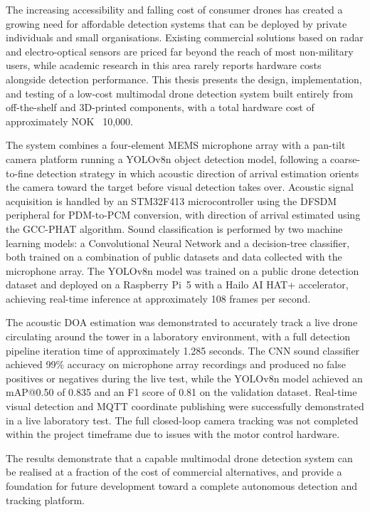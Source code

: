 The increasing accessibility and falling cost of consumer drones has 
created a growing need for affordable detection systems that can be 
deployed by private individuals and small organisations. Existing 
commercial solutions based on radar and electro-optical sensors are 
priced far beyond the reach of most non-military users, while 
academic research in this area rarely reports hardware costs alongside 
detection performance. This thesis presents the design, implementation, 
and testing of a low-cost multimodal drone detection system built 
entirely from off-the-shelf and 3D-printed components, with a total 
hardware cost of approximately NOK~ 10,000.

The system combines a four-element MEMS microphone array with a 
pan-tilt camera platform running a YOLOv8n object detection model, 
following a coarse-to-fine detection strategy in which acoustic 
direction of arrival estimation orients the camera toward the target 
before visual detection takes over. Acoustic signal acquisition is 
handled by an STM32F413 microcontroller using the DFSDM peripheral 
for PDM-to-PCM conversion, with direction of arrival estimated using 
the GCC-PHAT algorithm. Sound classification is performed by two 
machine learning models: a Convolutional Neural Network and a 
decision-tree classifier, both trained on a combination of public 
datasets and data collected with the microphone array. The YOLOv8n 
model was trained on a public drone detection dataset and deployed 
on a Raspberry Pi~5 with a Hailo AI HAT+ accelerator, achieving 
real-time inference at approximately 108 frames per second.

The acoustic DOA estimation was demonstrated to accurately track a 
live drone circulating around the tower in a laboratory environment, 
with a full detection pipeline iteration time of approximately 1.285 
seconds. The CNN sound classifier achieved 99\% accuracy on 
microphone array recordings and produced no false positives or 
negatives during the live test, while the YOLOv8n model achieved an 
mAP@0.50 of 0.835 and an F1 score of 0.81 on the validation dataset. 
Real-time visual detection and MQTT coordinate publishing were 
successfully demonstrated in a live laboratory test. The full 
closed-loop camera tracking was not completed within the project 
timeframe due to issues with the motor control hardware.

The results demonstrate that a capable multimodal drone detection 
system can be realised at a fraction of the cost of commercial 
alternatives, and provide a foundation for future development toward 
a complete autonomous detection and tracking platform.



